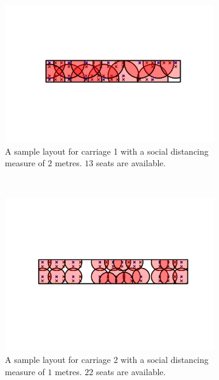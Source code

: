 \documentclass[11pt,a4paper]{article}
\begin{document}
\begin{figure}[ht!]
\begin{subfigure}[h]{0.490\linewidth}
\includegraphics[width = \linewidth]{class150_first_car_2m.png}
\caption{A sample layout for carriage 1 with a social distancing measure of $2$ metres. $13$ seats are available.}
\label{TwoMetre1}
\end{subfigure}
~
\begin{subfigure}[h]{0.49\linewidth}
\centering
\includegraphics[width = \linewidth]{class150_second_car_1m.png}
\caption{A sample layout for carriage 2 with a social distancing measure of $1$ metres. $22$ seats are available.}
\label{OneMetre2}
\end{subfigure}
~
\begin{subfigure}[h]{0.490\linewidth}
\centering

\end{subfigure}
\end{figure}
\end{document}
